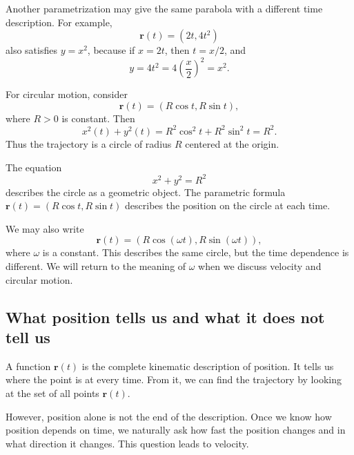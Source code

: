 Another parametrization may give the same parabola with a different time description. For example,
\[
\mathbf{r}(t)=(2t,4t^2)
\]
also satisfies \(y=x^2\), because if \(x=2t\), then \(t=x/2\), and
\[
y=4t^2=4\left(\frac{x}{2}\right)^2=x^2.
\]

\begin{examplebox}
For circular motion, consider
\[
\mathbf{r}(t)=(R\cos t,R\sin t),
\]
where \(R>0\) is constant. Then
\[
x^2(t)+y^2(t)
=R^2\cos^2t+R^2\sin^2t
=R^2.
\]
Thus the trajectory is a circle of radius \(R\) centered at the origin.
\end{examplebox}

The equation
\[
x^2+y^2=R^2
\]
describes the circle as a geometric object. The parametric formula \(\mathbf{r}(t)=(R\cos t,R\sin t)\) describes the position on the circle at each time.

We may also write
\[
\mathbf{r}(t)=(R\cos(\omega t),R\sin(\omega t)),
\]
where \(\omega\) is a constant. This describes the same circle, but the time dependence is different. We will return to the meaning of \(\omega\) when we discuss velocity and circular motion.

\subsection{What position tells us and what it does not tell us}

A function \(\mathbf{r}(t)\) is the complete kinematic description of position. It tells us where the point is at every time. From it, we can find the trajectory by looking at the set of all points \(\mathbf{r}(t)\).

However, position alone is not the end of the description. Once we know how position depends on time, we naturally ask how fast the position changes and in what direction it changes. This question leads to velocity.

